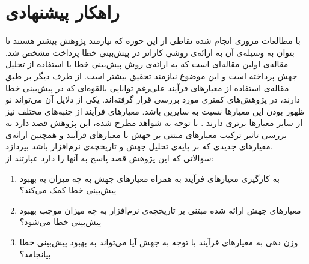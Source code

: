 \section{راهکار پیشنهادی}
\label{sec:method}
با  مطالعات مروری انجام شده نقاطی از این حوزه که نیازمند پژوهش بیشتر هستند تا بتوان به وسیله‌ی آن به ارائه‌ی روشی کاراتر در پیش‌بینی خطا پرداخت مشخص شد. مقاله‌ی \cite{bowes2016mutation} اولین مقاله‌ای است که  به ارائه‌ی روش پیش‌بینی خطا با استفاده از تحلیل جهش پرداخته است و این موضوع نیازمند تحقیق بیشتر است. از طرف دیگر بر طبق مقاله‌ی \cite{radjenovic2013software} استفاده از معیارهای فرآیند علی‌رغم توانایی بالقوه‌ای که در پیش‌بینی خطا دارند، در پژوهش‌های کمتری مورد بررسی قرار گرفته‌اند. یکی از دلایل آن می‌تواند نو ظهور بودن این معیارها نسبت به سایرین باشد. معیارهای فرآیند از جنبه‌های مختلف نیز از سایر معیار‌ها برتری دارند \cite{rahman2013and}. با توجه به شواهد مطرح شده، این پژوهش قصد دارد به بررسی تاثیر ترکیب معیارهای مبتنی بر جهش با معیارهای فرآیند و همچنین ارائه‌ی معیارهای جدیدی که بر پایه‌ی تحلیل جهش و تاریخچه‌ی نرم‌افزار باشد بپردازد.\\
سوالاتی که این پژوهش قصد پاسخ به آنها را دارد عبارتند از:

\begin{enumerate}
	\item  
	به کارگیری معیارهای فرآیند به همراه معیارهای جهش به چه میزان به بهبود پیش‌بینی خطا کمک می‌کند؟
	\item 
	معیارهای جهش ارائه شده مبتنی بر تاریخچه‌ی نرم‌افزار به چه میزان موجب بهبود پیش‌بینی خطا می‌شود؟
	\item 
	وزن دهی به معیارهای فرآیند با توجه به جهش آیا می‌تواند به بهبود پیش‌بینی خطا بیانجامد؟  
\end{enumerate}

